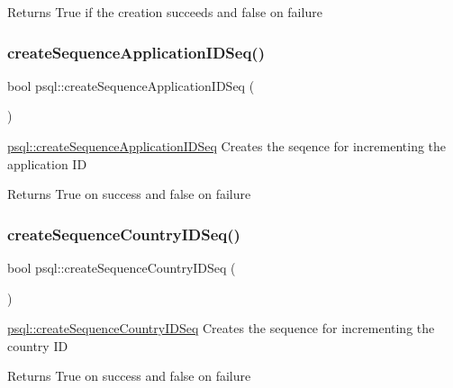\begin{DoxyReturn}{Returns}
True if the creation succeeds and false on failure 
\end{DoxyReturn}
\mbox{\label{classpsql_a54c75d0896ee6aad58e22c830895c106}} 
\subsubsection{\texorpdfstring{create\+Sequence\+Application\+I\+D\+Seq()}{createSequenceApplicationIDSeq()}}
{\footnotesize\ttfamily bool psql\+::create\+Sequence\+Application\+I\+D\+Seq (\begin{DoxyParamCaption}{ }\end{DoxyParamCaption})}



\mbox{\hyperlink{classpsql_a54c75d0896ee6aad58e22c830895c106}{psql\+::create\+Sequence\+Application\+I\+D\+Seq}} Creates the seqence for incrementing the application ID 

\begin{DoxyReturn}{Returns}
True on success and false on failure 
\end{DoxyReturn}
\mbox{\label{classpsql_aa907c84f592212451d3d59a2061adabd}} 
\subsubsection{\texorpdfstring{create\+Sequence\+Country\+I\+D\+Seq()}{createSequenceCountryIDSeq()}}
{\footnotesize\ttfamily bool psql\+::create\+Sequence\+Country\+I\+D\+Seq (\begin{DoxyParamCaption}{ }\end{DoxyParamCaption})}



\mbox{\hyperlink{classpsql_aa907c84f592212451d3d59a2061adabd}{psql\+::create\+Sequence\+Country\+I\+D\+Seq}} Creates the sequence for incrementing the country ID 

\begin{DoxyReturn}{Returns}
True on success and false on failure 
\end{DoxyReturn}
\mbox{\label{classpsql_ae882aa80b2d629383fc2e60aecfd421a}} 
